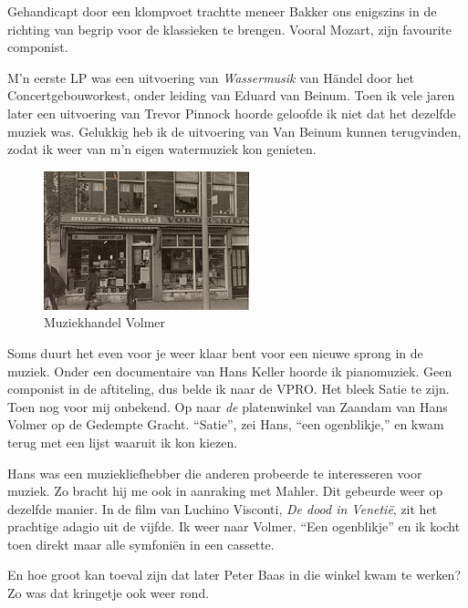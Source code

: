 \documentclass[12pt,twoside]{memoir}
\begin{document}
Gehandicapt door een klompvoet trachtte meneer Bakker ons enigszins in de richting van begrip voor de klassieken te brengen. Vooral Mozart, zijn favourite componist.

M’n eerste LP was een uitvoering van \emph{Wassermusik} van Händel door het Concertgebouworkest, onder leiding van Eduard van Beinum. Toen ik vele jaren later een uitvoering van Trevor Pinnock hoorde geloofde ik niet dat het dezelfde muziek was. Gelukkig heb ik de uitvoering van Van Beinum kunnen terugvinden, zodat ik weer van m’n eigen watermuziek kon genieten. 

\begin{figure}
\includegraphics[width=\textwidth]{img/ch16/volmer}
\caption*{\footnotesize Muziekhandel Volmer}
\end{figure}

Soms duurt het even voor je weer klaar bent voor een nieuwe sprong in de muziek. Onder een documentaire van Hans Keller hoorde ik pianomuziek. Geen componist in de aftiteling, dus belde ik naar de VPRO. Het bleek Satie te zijn. Toen nog voor mij onbekend. Op naar \emph{de} platenwinkel van Zaandam van Hans Volmer op de Gedempte Gracht. ``Satie'', zei Hans, ``een ogenblikje,'' en kwam terug met een lijst waaruit ik kon kiezen. 

Hans was een muziekliefhebber die anderen probeerde te interesseren voor muziek. Zo bracht hij me ook in aanraking met Mahler. Dit gebeurde weer op dezelfde manier. In de film van Luchino Visconti, \emph{De dood in Venetië}, zit het prachtige adagio uit de vijfde. Ik weer naar Volmer. ``Een ogenblikje'' en ik kocht toen direkt maar alle symfoniën in een cassette.

En hoe groot kan toeval zijn dat later Peter Baas in die winkel kwam te werken? Zo was dat kringetje ook weer rond. 
\end{document}
